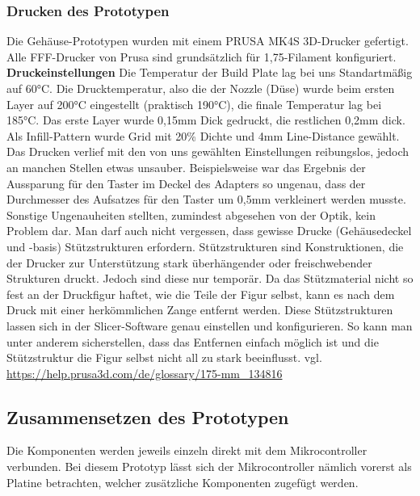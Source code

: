 \documentclass[]{article}
\begin{document}
\subsubsection{Drucken des Prototypen}
Die Gehäuse-Prototypen wurden mit einem \glqq PRUSA MK4S\grqq{} 3D-Drucker gefertigt. Alle FFF-Drucker von Prusa sind grundsätzlich für 1,75-Filament konfiguriert.
\vspace{4mm}\newline
\textbf{Druckeinstellungen} \newline
Die Temperatur der Build Plate lag bei uns Standartmäßig auf 60°C. Die Drucktemperatur, also die der Nozzle (Düse) wurde beim ersten Layer auf 200°C eingestellt (praktisch 190°C), die finale Temperatur lag bei 185°C. \newline
Das erste Layer wurde 0,15mm Dick gedruckt, die restlichen 0,2mm dick. \newline
Als Infill-Pattern wurde \glqq Grid\grqq{} mit 20\% Dichte und 4mm Line-Distance gewählt. \newline
Das Drucken verlief mit den von uns gewählten Einstellungen reibungslos, jedoch an manchen Stellen etwas unsauber. Beispielsweise war das Ergebnis der Aussparung für den Taster im Deckel des Adapters so ungenau, dass der Durchmesser des Aufsatzes für den Taster um 0,5mm verkleinert werden musste. Sonstige Ungenauheiten stellten, zumindest abgesehen von der Optik, kein Problem dar. \newline
Man darf auch nicht vergessen, dass gewisse Drucke (Gehäusedeckel und -basis) Stützstrukturen erfordern. Stützstrukturen sind Konstruktionen, die der Drucker zur Unterstützung stark überhängender oder freischwebender Strukturen druckt. Jedoch sind diese nur temporär. Da das Stützmaterial nicht so fest an der Druckfigur haftet, wie die Teile der Figur selbst, kann es nach dem Druck mit einer herkömmlichen Zange entfernt werden. Diese Stützstrukturen lassen sich in der Slicer-Software genau einstellen und konfigurieren. So kann man unter anderem sicherstellen, dass das Entfernen einfach möglich ist und die Stützstruktur die Figur selbst nicht all zu stark beeinflusst.
\vspace{4mm}\newline
vgl. \url{https://help.prusa3d.com/de/glossary/175-mm_134816}
\subsection{Zusammensetzen des Prototypen}
Die Komponenten werden jeweils einzeln direkt mit dem Mikrocontroller verbunden. Bei diesem Prototyp lässt sich der Mikrocontroller nämlich vorerst als Platine betrachten, welcher zusätzliche Komponenten zugefügt werden.
\end{document}
